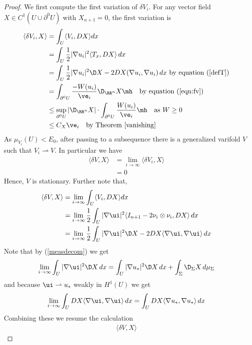 \begin{proof}
We first compute the first variation of $\delta V_i$. For any vector field $X\in C^1(U\cup \partial^0U)$ with $X_{n+1}=0$, the first variation is
\begin{align*}
    \langle \delta V_i, X \rangle
    &= \int_{U} \langle V_i , DX \rangle  dx  \\
    &= \int_U \frac{1}{2}|\nabla u_i|^2\langle T_x, DX \rangle \,dx \\
    &= \int_U \frac{1}{2}|\nabla u_i|^2\D X - 2DX(\nabla u_i, \nabla u_i)  \,dx \text{ by equation (\ref{defT})} \\
    &= \int_{\partial^0 U} \frac{-W(u_i)}{\ve_i} \D_{\RR^n} X \mh \quad \text{by equation (\ref{eqn:fv})} \\
    &\leq  \sup_{\partial^0 U}|\D_{\RR^n} X| \cdot \int_{\partial^0 U} \frac{W(u_i)}{\ve_i}  \mh  \quad \text{as } W \geq 0 \\
    &\leq C_{X} \ve_i \quad \text{by Theorem \ref{vanishing}}
\end{align*}
As $\mu_{V_i}(U) < E_0$, after passing to a subsequence there is a generalized varifold $V$ such that $V_i \rightharpoonup V$. In particular we have
\begin{align}
    \langle \delta V, X \rangle 
    &= \lim_{i \to \infty} \langle \delta V_i, X \rangle \\
    &=0   \label{Tsta}
\end{align}
Hence, $V$ is stationary. Further note that,
\begin{align*}
    \langle \delta V, X \rangle 
    &= \lim_{i\to \infty}\int_{U} \langle V_i , DX \rangle  dx \\
    &=\lim_{i \to \infty} \frac{1}{2} \int_{U}|\nabla \ui|^2 \langle I_{n+1} - 2 \nu_i \otimes \nu_i , DX \rangle \,dx  \\
    &=\lim_{i \to \infty} \frac{1}{2} \int_{U}|\nabla \ui|^2 \D X - 2DX\langle\nabla \ui,\nabla \ui\rangle \,dx  \\
\end{align*}
Note that by (\ref{measdecom}) we get
$$
\lim_{i \to \infty} \int_{U}|\nabla \ui|^2 \D X \,dx = \int_U |\nabla u_*|^2 \D X \,dx + \int_{\Sigma} \D_{\Sigma} X \,d\mu_{\Sigma}
$$
and because $\ui \rightharpoonup u_*$ weakly in $H^1(U)$ we get
$$
\lim_{i \to \infty}  \int_{U} DX\langle\nabla \ui,\nabla \ui\rangle \,dx = \int_U DX\langle\nabla u_*, \nabla u_*\rangle \,dx
$$
Combining these we resume the calculation
\begin{align*} 
    \langle \delta V, X \rangle  

\end{align*}
\end{proof}
